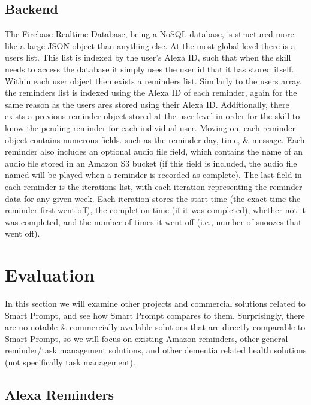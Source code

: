 \documentclass[11pt, oneside]{article}
\begin{document}
\subsection{Backend}

The Firebase Realtime Database, being a NoSQL database, is structured more like a large JSON object than anything else. 
At the most global level there is a users list. 
This list is indexed by the user's Alexa ID, such that when the skill needs to access the database it simply uses the user id that it has stored itself. 
Within each user object then exists a reminders list. 
Similarly to the users array, the reminders list is indexed using the Alexa ID of each reminder, again for the same reason as the users ares stored using their Alexa ID. 
Additionally, there exists a previous reminder object stored at the user level in order for the skill to know the pending reminder for each individual user. 
Moving on, each reminder object contains numerous fields. such as the reminder day, time, \& message. 
Each reminder also includes an optional audio file field, which contains the name of an audio file stored in an Amazon S3 bucket (if this field is included, the audio file named will be played when a reminder is recorded as complete).
The last field in each reminder is the iterations list, with each iteration representing the reminder data for any given week. 
Each iteration stores the start time (the exact time the reminder first went off), the completion time (if it was completed), whether not it was completed, and the number of times it went off (i.e., number of snoozes that went off). 

\section{Evaluation}

In this section we will examine other projects and commercial solutions related to Smart Prompt, and see how Smart Prompt compares to them. 
Surprisingly, there are no notable \& commercially available solutions that are directly comparable to Smart Prompt, so we will focus on existing Amazon reminders, other general reminder/task management solutions, and other dementia related health solutions (not specifically task management). 

\subsection{Alexa Reminders}
\end{document}
